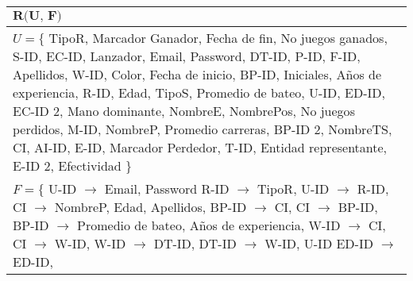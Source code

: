 \documentclass{report}
\begin{document}
    \begin{tabularx}{\textwidth}{|X|}
        \toprule
        \hfil $\textbf{R(U, F)}$ \\
        \midrule
        \vspace*{0.01cm}
        $U = \{ $ TipoR, Marcador Ganador, Fecha de fin, No juegos ganados, S-ID, EC-ID, Lanzador, Email, Password, DT-ID, P-ID, F-ID, Apellidos, W-ID, Color, Fecha de inicio, BP-ID, Iniciales, Años de experiencia, R-ID, Edad, TipoS, Promedio de bateo, U-ID, ED-ID, EC-ID 2, Mano dominante, NombreE, NombrePos, No juegos perdidos, M-ID, NombreP, Promedio carreras, BP-ID 2, NombreTS, CI, AI-ID, E-ID, Marcador Perdedor, T-ID, Entidad representante, E-ID 2, Efectividad $\} $ 
        \vspace*{0.15cm} \\
        \midrule
        \vspace*{0.01cm}
        $F = \{$
        U-ID $\rightarrow$ Email, Password \newline
        \hspace*{0.9cm} R-ID $\rightarrow$ TipoR, \newline
        \hspace*{0.9cm} U-ID $\rightarrow$ R-ID, \newline
        \hspace*{0.9cm} CI $\rightarrow$ NombreP, Edad, Apellidos, \newline
        \hspace*{0.9cm} BP-ID $\rightarrow$ CI, \newline
        \hspace*{0.9cm} CI $\rightarrow$ BP-ID, \newline
        \hspace*{0.9cm} BP-ID $\rightarrow$ Promedio de bateo, Años de experiencia, \newline
        \hspace*{0.9cm} W-ID $\rightarrow$ CI, \newline
        \hspace*{0.9cm} CI $\rightarrow$ W-ID, \newline
        \hspace*{0.9cm} W-ID $\rightarrow$ DT-ID, \newline
        \hspace*{0.9cm} DT-ID $\rightarrow$ W-ID, U-ID \newline
        \hspace*{0.9cm} ED-ID $\rightarrow$ ED-ID, \newline

\end{tabularx}
\end{document}
